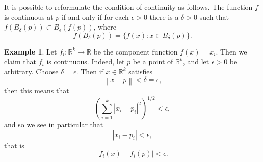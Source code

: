 \documentclass[12pt]{article}
\newcommand{\norm}[1]{\left\lVert#1\right\rVert}
\theoremstyle{definition}
\newtheorem{example}[definition]{Example}
\theoremstyle{theorem}
\begin{document}
It is possible to reformulate the condition of continuity as follows. The function $f$ is continuous at $p$ if and only if for each $\epsilon > 0$ there is a $\delta > 0$ such that $f(B_\delta(p)) \subset B_\epsilon(f(p))$, where 
\[
f(B_\delta(p)) = \{f(x) : x \in B_\delta(p)\}.
\]

\begin{example}
Let $f_i : \mathbb{R}^k \to \mathbb{R}$ be the component function $f(x) = x_i.$ Then we claim that $f_i$ is continuous. Indeed, let $p$ be a point of $\mathbb{R}^k$, and let $\epsilon > 0$ be arbitrary. Choose $\delta = \epsilon$. Then if $x \in \mathbb{R}^k$ satisfies 
\[
\norm{x - p} < \delta = \epsilon,
\]
then this means that 
\[
\left(\sum_{i=1}^k |x_i - p_i|^2 \right)^{1/2} < \epsilon,
\] 
and so we see in particular that 
\[
|x_i - p_i| < \epsilon,
\]
that is 
\[
|f_i(x) - f_i(p)| < \epsilon.
\]
\end{example}
\end{document}
